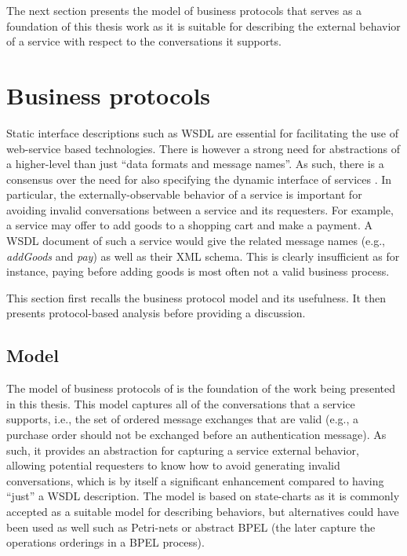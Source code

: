 The next section presents the model of business protocols \cite{FTBB} that serves as a foundation of this thesis work as it is suitable for describing the external behavior of a service with respect to the conversations it supports.


\section{Business protocols}


Static interface descriptions such as WSDL are essential for facilitating the use of web-service based technologies. There is however a strong need for abstractions of a higher-level than just ``data formats and message names''. As such, there is a consensus over the need for also specifying the dynamic interface of services \cite{PTDL07,PH07,ws_cacm_special_issue}. In particular, the externally-observable behavior of a service is important for avoiding invalid conversations between a service and its requesters. For example, a service may offer to add goods to a shopping cart and make a payment. A WSDL document of such a service would give the related message names (e.g., \emph{addGoods} and \emph{pay}) as well as their XML schema. This is clearly insufficient as for instance, paying before adding goods is most often not a valid business process.

This section first recalls the business protocol model and its usefulness. It then presents protocol-based analysis before providing a discussion.


\subsection{Model}


The model of business protocols of \cite{FTBB,BBFC04,BCT-CAISE03,KBBB+04} is the foundation of the work being presented in this thesis. This model captures all of the conversations that a service supports, i.e., the set of ordered message exchanges that are valid (e.g., a purchase order should not be exchanged before an authentication message). As such, it provides an abstraction for capturing a service external behavior, allowing potential requesters to know how to avoid generating invalid conversations, which is by itself a significant enhancement compared to having ``just'' a WSDL description. The model is based on state-charts as it is commonly accepted as a suitable model for describing behaviors, but alternatives could have been used as well such as Petri-nets or abstract BPEL (the later capture the operations orderings in a BPEL process).\\

